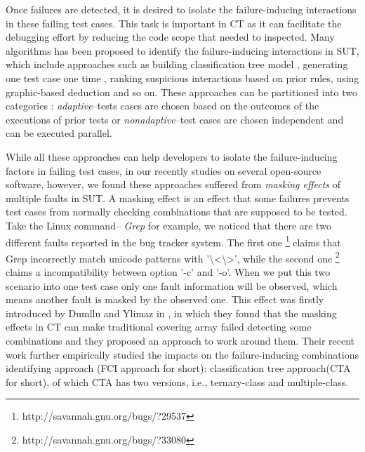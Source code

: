 \documentclass{sig-alternate}
\begin{document}
Once failures are detected, it is desired to isolate the failure-inducing interactions in these failing test cases. This task is important in CT as it can facilitate the debugging effort by reducing the code scope that needed to inspected. Many algorithms has been proposed to identify the failure-inducing interactions in SUT, which include approaches such as building classification tree model \cite{yilmaz2006covering}, generating one test case one time \cite{nie2011minimal}, ranking suspicious interactions based on prior rules\cite{ghandehari2012identifying}, using graphic-based deduction \cite{martinez2008algorithms} and so on. These approaches can be partitioned into two categories \cite{colbourn2008locating}: \emph{adaptive}--tests cases are chosen based on the outcomes of the executions of prior tests or \emph{nonadaptive}--test cases are chosen independent and can be executed parallel.


While all these approaches can help developers to isolate the failure-inducing factors in failing test cases, in our recently studies on several open-source software, however, we found these approaches suffered from \emph{masking effects} of multiple faults in SUT. A masking effect \cite{dumlu2011feedback,yilmaz2013reducing} is an effect that some failures prevents test cases from normally checking combinations that are supposed to be tested. Take the Linux command-- \emph{Grep} for example, we noticed that there are two different faults reported in the bug tracker system. The first one \footnote{http://savannah.gnu.org/bugs/?29537}  claims that Grep incorrectly match unicode patterns with '\textbackslash<\textbackslash>', while the second one \footnote{http://savannah.gnu.org/bugs/?33080} claims a incompatibility between option '-c' and '-o'. When we put this two scenario into one test case only one fault information will be observed, which means another fault is masked by the observed one. This effect was firstly introduced by Dumllu and Ylimaz in \cite{dumlu2011feedback}, in which they found that the masking effects in CT can make traditional covering array failed detecting some combinations and they proposed an approach to work around them. Their recent work \cite{yilmaz2013reducing} further empirically studied the impacts on the failure-inducing combinations identifying approach (FCI approach for short):  classification tree approach(CTA for short)\cite{yilmaz2006covering}, of which CTA has two versions, i.e., ternary-class and multiple-class.
\end{document}

